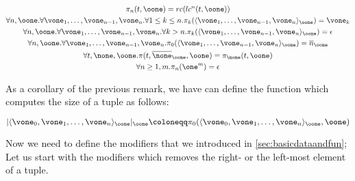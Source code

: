 \begin{remark}
\label{rem:tupleencoding}
\[
\begin{gathered}
\pi_n(t, \oone) = rc(lc^n(t, \oone))\\
\forall n, \oone.\forall \vone_1, \ldots, \vone_{n-1}, \vone_n.\forall 1\le k \le n. \pi_k(\langle \vone_1, \ldots, \vone_{n-1}, \vone_{n}\rangle_\oone)= \vone_k\\
\forall n, \oone.\forall \vone_1, \ldots, \vone_{n-1}, \vone_n.\forall k > n. \pi_k(\langle \vone_1, \ldots, \vone_{n-1}, \vone_{n}\rangle_\oone)= \epsilon\\
\forall n, \oone.\forall \vone_1, \ldots, \vone_{n-1}, \vone_n. \pi_0(\langle \vone_1, \ldots, \vone_{n-1}, \vone_{n}\rangle_\oone)= \overline n_\oone\\
\forall t, \none, \oone. \pi(t, \overline\none_\oone, \oone)= \pi_\none(t, \oone)\\
\forall n\ge 1, m. \pi_n(\one^m)=\epsilon
\end{gathered}
\]
\end{remark}

As a corollary of the previous remark, we have can define the function which computes the size of a tuple as follows:

\[
|\langle \vone_0, \vone_1, \ldots, \vone_n\rangle_\oone|_\oone\coloneqq \pi_0(\langle \vone_0, \vone_1, \ldots, \vone_n\rangle_\oone, \oone)
\]

\begin{comment}
Tuple's belonging:

\begin{align*}
\bgs'(\vone, \epsilon, \oone) &\coloneqq \zero\\
\bgs'(\vone_1, \vone_2, \vtwo\one, \oone) &\coloneqq eq(rc(\vone_2, \oone), \vone_1, \oone)\lor_\oone \bgs'(\vone_1, lc(\vone_2, \vtwo, \oone), \vtwo, \oone)\\
\bgs'(\vone_1, \vone_2, \vtwo\zero, \oone) &\coloneqq eq(rc(\vone_2, \oone), \vone_1, \oone)\lor_\oone \bgs'(\vone_1, lc(\vone_2, \vtwo, \oone), \vtwo, \oone)\\
\bgs(el, t, \oone)&\coloneqq \bgs'(el, t, \pred(|t|_\oone), \oone)
\end{align*}
\end{comment}

Now we need to define the modifiers that we introduced in \ref{sec:basicdataandfun}; Let us start with the modifiers which removes the right- or the left-most element of a tuple.


